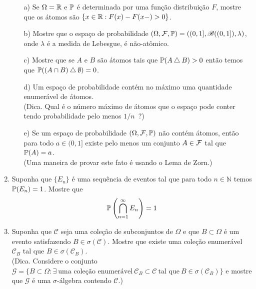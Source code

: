 \begin{enumerate}[leftmargin=*]
	\begin{itemize}
		\item[a)]
		Se $\Omega=\R$ e $\P$ é determinada por uma 
		função distribuição $F$, mostre que os átomos
		são $\{x\in\R: F(x)-F(x-)>0\}$.
				
		\item[b)]
		Mostre que o espaço de probabilidade  
		$(\Omega,\F,\P)=((0,1],\mathscr{B}((0,1]),\lambda)$,
		onde $\lambda$ é a medida de Lebesgue, é não-atômico. 

		\item[c)]
		Mostre que se $A$ e $B$ são átomos tais que
		$\P(A\bigtriangleup B)>0$ então temos que
		$\P((A\cap B) \bigtriangleup \emptyset)=0$.


		\item[d)] 
		Um espaço de probabilidade contém no máximo 
		uma quantidade enumerável de átomos. 
		\\
		(Dica. Qual é o número máximo de átomos que o
		espaço pode conter tendo probabilidade pelo menos $1/n$\ ?)
		
		
		\item[e)]
		Se um espaço de probabilidade $(\Omega,\F,\P)$
		não contém átomos, então para todo $a\in (0,1]$
		existe pelo menos um conjunto $A\in\F$ tal que 
		$\P(A)=a$. 
		\\
		(Uma maneira de provar este fato é usando o Lema de Zorn.)
	\end{itemize}






\item
Suponha que $\{E_n\}$ é uma sequência de eventos tal que
para todo $n\in\mathbb{N}$ temos $\P(E_n)=1$. Mostre que 
\[	
	\P\left(  \bigcap_{n=1}^{\infty} E_n\right) =1 
\]






\item
Suponha que $\mathcal{C}$ seja uma coleção de subconjuntos de 
$\Omega$ e que $B\subset \Omega$ é um evento satisfazendo
$B\in\sigma(\mathcal{C})$.
Mostre que existe uma coleção enumerável $\mathcal{C}_{B}$
tal que $B\in \sigma(\mathcal{C}_{B})$.
\\
(Dica. Considere o conjunto 
$\mathcal{G}=\{ B\subset\Omega: \exists\ \text{uma coleção enumerável}\ 
\mathcal{C}_B\subset \mathcal{C}\ 
\text{tal que}\ B\in\sigma(\mathcal{C}_{B}) \}
$
e mostre que $\mathcal{G}$ é uma $\sigma$-álgebra contendo
$\mathcal{C}$.)








\end{enumerate}
